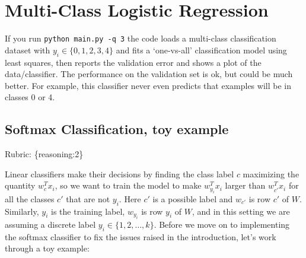 \documentclass{article}
\def\rubric#1{\gre{Rubric: \{#1\}}}{}
\def\gre#1{{\color{gre}#1}}
\begin{document}
\section{Multi-Class Logistic Regression}

If you run \verb|python main.py -q 3| the code loads a multi-class
classification dataset with $y_i \in \{0,1,2,3,4\}$ and fits a `one-vs-all' classification
model using least squares, then reports the validation error and shows a plot of the data/classifier.
The performance on the validation set is ok, but could be much better.
For example, this classifier never even predicts that examples will be in classes 0 or 4.


\subsection{Softmax Classification, toy example}
\rubric{reasoning:2}

Linear classifiers make their decisions by finding the class label $c$ maximizing the quantity $w_c^Tx_i$, so we want to train the model to make $w_{y_i}^Tx_i$ larger than $w_{c'}^Tx_i$ for all the classes $c'$ that are not $y_i$.
Here $c'$ is a possible label and $w_{c'}$ is row $c'$ of $W$. Similarly, $y_i$ is the training label, $w_{y_i}$ is row $y_i$ of $W$, and in this setting we are assuming a discrete label $y_i \in \{1,2,\dots,k\}$. Before we move on to implementing the softmax classifier to fix the issues raised in the introduction, let's work through a toy example:
\end{document}
